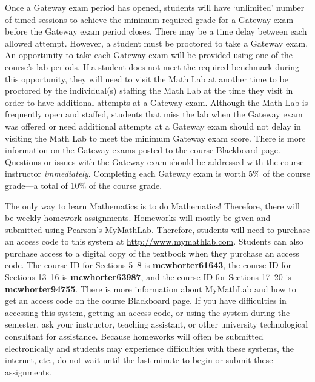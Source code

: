 \documentclass[11pt,letterpaper]{article}
\begin{document}
Once a Gateway exam period has opened, students will have `unlimited' number of timed sessions to achieve the minimum required grade for a Gateway exam before the Gateway exam period closes. There may be a time delay between each allowed attempt. However, a student must be proctored to take a Gateway exam. An opportunity to take each Gateway exam will be provided using one of the course's lab periods. If a student does not meet the required benchmark during this opportunity, they will need to visit the Math Lab at another time to be proctored by the individual(s) staffing the Math Lab at the time they visit in order to have additional attempts at a Gateway exam. Although the Math Lab is frequently open and staffed, students that miss the lab when the Gateway exam was offered or need additional attempts at a Gateway exam should not delay in visiting the Math Lab to meet the minimum Gateway exam score. There is more information on the Gateway exams posted to the course Blackboard page. Questions or issues with the Gateway exam should be addressed with the course instructor \textit{immediately}. Completing each Gateway exam is worth 5\% of the course grade---a total of 10\% of the course grade. 
\sectionbreak




The only way to learn Mathematics is to do Mathematics! Therefore, there will be weekly homework assignments. Homeworks will mostly be given and submitted using Pearson's MyMathLab. Therefore, students will need to purchase an access code to this system at \url{http://www.mymathlab.com}. Students can also purchase access to a digital copy of the textbook when they purchase an access code. The course ID for Sections 5--8 is \textbf{mcwhorter61643}, the course ID for Sections 13--16 is \textbf{mcwhorter63987}, and the course ID for Sections 17--20 is \textbf{mcwhorter94755}. There is more information about MyMathLab and how to get an access code on the course Blackboard page. If you have difficulties in accessing this system, getting an access code, or using the system during the semester, ask your instructor, teaching assistant, or other university technological consultant for assistance. Because homeworks will often be submitted electronically and students may experience difficulties with these systems, the internet, etc., do not wait until the last minute to begin or submit these assignments. \pspace
\end{document}

